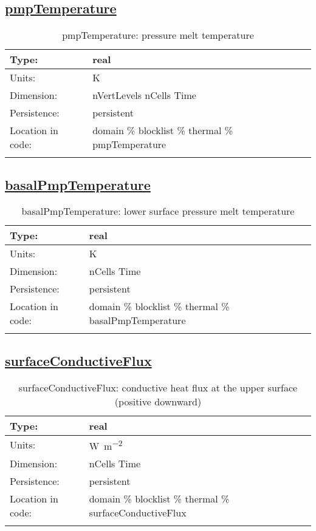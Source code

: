\subsection[pmpTemperature]{\hyperref[sec:var_tab_thermal]{pmpTemperature}}
\label{subsec:var_sec_thermal_pmpTemperature}
\begin{center}
\begin{longtable}{| p{2.0in} | p{4.0in} |}
        \hline 
        Type: & real \\
        \hline 
        Units: & \si{K} \\
        \hline 
        Dimension: & nVertLevels nCells Time \\
        \hline 
        Persistence: & persistent \\
        \hline 
         Location in code: & domain \% blocklist \% thermal \% pmpTemperature \\
         \hline 
    \caption{pmpTemperature: pressure melt temperature}
\end{longtable}
\end{center}
\subsection[basalPmpTemperature]{\hyperref[sec:var_tab_thermal]{basalPmpTemperature}}
\label{subsec:var_sec_thermal_basalPmpTemperature}
\begin{center}
\begin{longtable}{| p{2.0in} | p{4.0in} |}
        \hline 
        Type: & real \\
        \hline 
        Units: & \si{K} \\
        \hline 
        Dimension: & nCells Time \\
        \hline 
        Persistence: & persistent \\
        \hline 
         Location in code: & domain \% blocklist \% thermal \% basalPmpTemperature \\
         \hline 
    \caption{basalPmpTemperature: lower surface pressure melt temperature}
\end{longtable}
\end{center}
\subsection[surfaceConductiveFlux]{\hyperref[sec:var_tab_thermal]{surfaceConductiveFlux}}
\label{subsec:var_sec_thermal_surfaceConductiveFlux}
\begin{center}
\begin{longtable}{| p{2.0in} | p{4.0in} |}
        \hline 
        Type: & real \\
        \hline 
        Units: & \si{W.m^{-2}} \\
        \hline 
        Dimension: & nCells Time \\
        \hline 
        Persistence: & persistent \\
        \hline 
         Location in code: & domain \% blocklist \% thermal \% surfaceConductiveFlux \\
         \hline 
    \caption{surfaceConductiveFlux: conductive heat flux at the upper surface (positive downward)}
\end{longtable}
\end{center}
